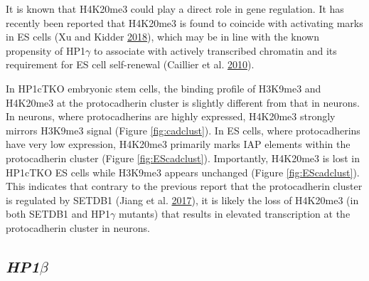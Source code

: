\documentclass[onehalf,12pt]{beavtex}
\begin{document}
  It is known that H4K20me3 could play a direct role in gene regulation.
  It has recently been reported that H4K20me3 is found to coincide with
  activating marks in ES cells (Xu and Kidder
  \protect\hyperlink{ref-XuH4K20me3colocalizesactivating2018}{2018}),
  which may be in line with the known propensity of HP1\(\gamma\) to
  associate with actively transcribed chromatin and its requirement for ES
  cell self-renewal (Caillier et al.
  \protect\hyperlink{ref-CaillierRoleEpigeneticRegulator2010}{2010}).
  
  In HP1cTKO embryonic stem cells, the binding profile of H3K9me3 and
  H4K20me3 at the protocadherin cluster is slightly different from that in
  neurons. In neurons, where protocadherins are highly expressed, H4K20me3
  strongly mirrors H3K9me3 signal (Figure \ref{fig:cadclust}). In ES
  cells, where protocadherins have very low expression, H4K20me3 primarily
  marks IAP elements within the protocadherin cluster (Figure
  \ref{fig:EScadclust}). Importantly, H4K20me3 is lost in HP1cTKO ES cells
  while H3K9me3 appears unchanged (Figure \ref{fig:EScadclust}). This
  indicates that contrary to the previous report that the protocadherin
  cluster is regulated by SETDB1 (Jiang et al.
  \protect\hyperlink{ref-JiangmethyltransferaseSETDB1regulates2017}{2017}),
  it is likely the loss of H4K20me3 (in both SETDB1 and HP1\(\gamma\)
  mutants) that results in elevated transcription at the protocadherin
  cluster in neurons.
  
  \subsection*{\texorpdfstring{\emph{HP1\(\beta\)}}{HP1\textbackslash{}beta}}\label{hp1beta}
  
\end{document}
